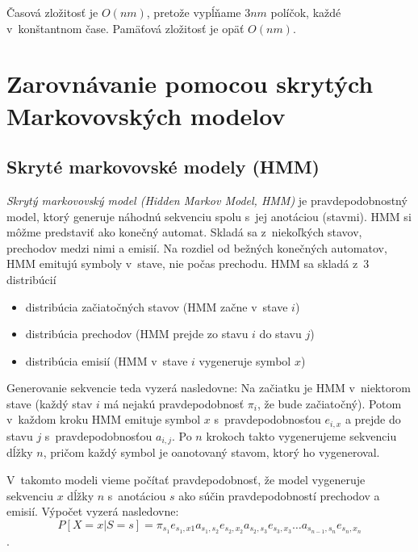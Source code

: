 Časová zložitosť je $O(nm)$, pretože vypĺňame $3nm$ políčok, každé v~konštantnom čase. Pamäťová zložitosť je opäť $O(nm)$.

\cite{durbin}

\section[Zarovnávanie s~pHMM]{Zarovnávanie pomocou skrytých Markovovských modelov}
\label{sec:hmm-alignment}

\subsection{Skryté markovovské modely (HMM)}
\textit{Skrytý markovovský model (Hidden Markov Model, HMM)} je pravdepodobnostný model, ktorý generuje náhodnú sekvenciu spolu s~jej anotáciou (stavmi). HMM si môžme predstaviť ako konečný automat. Skladá sa z~niekoľkých stavov, prechodov medzi nimi a emisií. Na rozdiel od bežných konečných automatov, HMM emitujú symboly v~stave, nie počas prechodu.
HMM sa skladá z~3 distribúcií
\begin{itemize}
\item distribúcia začiatočných stavov (HMM začne v~stave $i$)
\item distribúcia prechodov (HMM prejde zo stavu $i$ do stavu $j$)
\item distribúcia emisií (HMM v~stave $i$ vygeneruje symbol $x$)
\end{itemize}

Generovanie sekvencie teda vyzerá nasledovne: Na začiatku je HMM v~niektorom stave (každý stav $i$ má nejakú pravdepodobnosť $\pi_i$, že bude začiatočný). Potom v~každom kroku HMM emituje symbol $x$ s~pravdepodobnosťou $e_{i, x}$ a prejde do stavu $j$ s~pravdepodobnosťou $a_{i,j}$. Po $n$ krokoch takto vygenerujeme sekvenciu dĺžky $n$, pričom každý symbol je oanotovaný stavom, ktorý ho vygeneroval.

V~takomto modeli vieme počítať pravdepodobnosť, že model vygeneruje sekvenciu $x$ dĺžky $n$ s~anotáciou $s$ ako súčin pravdepodobností prechodov a emisií.
Výpočet vyzerá nasledovne: $$P[X=x | S=s] = \pi_{s_1} e_{s_1,x1} a_{s_1,s_2} e_{s_2,x_2} a_{s_2,s_3} e_{s_3,x_3}\dots a_{s_{n-1},s_n} e_{s_n,x_n}$$.
\cite{skripta, durbin}



